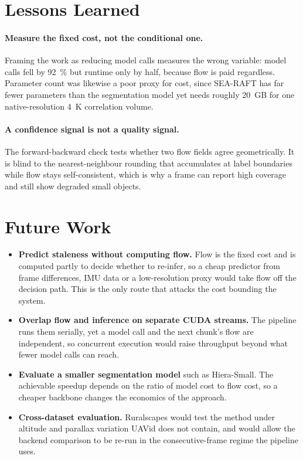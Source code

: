 \documentclass[report.tex]{subfiles}
\begin{document}
\section{Lessons Learned}
\label{sec:lessons}

\paragraph{Measure the fixed cost, not the conditional one.} Framing the work
as reducing model calls measures the wrong variable: model calls fell by
\SI{92}{\percent} but runtime only by half, because flow is paid regardless.
Parameter count was likewise a poor proxy for cost, since SEA-RAFT has far
fewer parameters than the segmentation model yet needs roughly \SI{20}{GB} for
one native-resolution \SI{4}{K} correlation volume.

\paragraph{A confidence signal is not a quality signal.} The forward-backward
check tests whether two flow fields agree geometrically. It is blind to the
nearest-neighbour rounding that accumulates at label boundaries while flow
stays self-consistent, which is why a frame can report high coverage and still
show degraded small objects.

\section{Future Work}
\label{sec:future}

\begin{itemize}
    \item \textbf{Predict staleness without computing flow.} Flow is the fixed
          cost and is computed partly to decide whether to re-infer, so a cheap
          predictor from frame differences, IMU data or a low-resolution proxy
          would take flow off the decision path. This is the only route that
          attacks the cost bounding the system.
    \item \textbf{Overlap flow and inference on separate CUDA streams.} The
          pipeline runs them serially, yet a model call and the next chunk's
          flow are independent, so concurrent execution would raise throughput
          beyond what fewer model calls can reach.
    \item \textbf{Evaluate a smaller segmentation model} such as Hiera-Small.
          The achievable speedup depends on the ratio of model cost to flow
          cost, so a cheaper backbone changes the economics of the approach.
    \item \textbf{Cross-dataset evaluation.} Ruralscapes would test the method
          under altitude and parallax variation UAVid does not contain, and
          would allow the backend comparison to be re-run in the
          consecutive-frame regime the pipeline uses.
\end{itemize}
\end{document}

